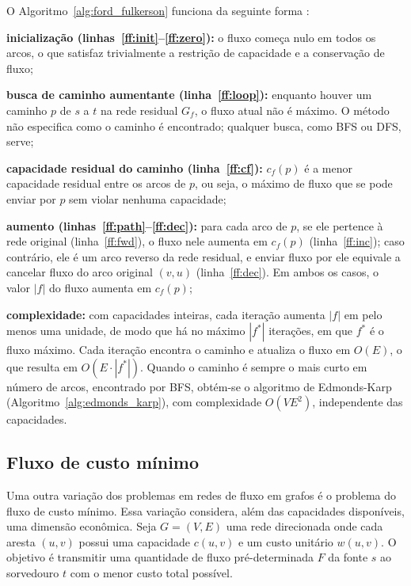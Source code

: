 O Algoritmo~\ref{alg:ford_fulkerson} funciona da seguinte forma \cite{cormen}:

\begin{alineas}
    \item \textbf{inicialização (linhas~\ref{ff:init}--\ref{ff:zero}):} o fluxo começa nulo em todos os arcos, o que satisfaz trivialmente a restrição de capacidade e a conservação de fluxo;
    \item \textbf{busca de caminho aumentante (linha~\ref{ff:loop}):} enquanto houver um caminho $p$ de $s$ a $t$ na rede residual $G_f$, o fluxo atual não é máximo. O método não especifica como o caminho é encontrado; qualquer busca, como BFS ou DFS, serve;
    \item \textbf{capacidade residual do caminho (linha~\ref{ff:cf}):} $c_f(p)$ é a menor capacidade residual entre os arcos de $p$, ou seja, o máximo de fluxo que se pode enviar por $p$ sem violar nenhuma capacidade;
    \item \textbf{aumento (linhas~\ref{ff:path}--\ref{ff:dec}):} para cada arco de $p$, se ele pertence à rede original (linha~\ref{ff:fwd}), o fluxo nele aumenta em $c_f(p)$ (linha~\ref{ff:inc}); caso contrário, ele é um arco reverso da rede residual, e enviar fluxo por ele equivale a cancelar fluxo do arco original $(v,u)$ (linha~\ref{ff:dec}). Em ambos os casos, o valor $|f|$ do fluxo aumenta em $c_f(p)$;
    \item \textbf{complexidade:} com capacidades inteiras, cada iteração aumenta $|f|$ em pelo menos uma unidade, de modo que há no máximo $|f^*|$ iterações, em que $f^*$ é o fluxo máximo. Cada iteração encontra o caminho e atualiza o fluxo em $O(E)$, o que resulta em $O(E \cdot |f^*|)$. Quando o caminho é sempre o mais curto em número de arcos, encontrado por BFS, obtém-se o algoritmo de Edmonds-Karp (Algoritmo~\ref{alg:edmonds_karp}), com complexidade $O(VE^2)$, independente das capacidades.
\end{alineas}

\subsection{Fluxo de custo mínimo}

Uma outra variação dos problemas em redes de fluxo em grafos é o problema do fluxo de custo mínimo. Essa variação considera, além das capacidades disponíveis, uma dimensão econômica. Seja $G=(V, E)$ uma rede direcionada onde cada aresta $(u,v)$ possui uma capacidade $c(u,v)$ e um custo unitário $w(u,v)$. O objetivo é transmitir uma quantidade de fluxo pré-determinada $F$ da fonte $s$ ao sorvedouro $t$ com o menor custo total possível.

